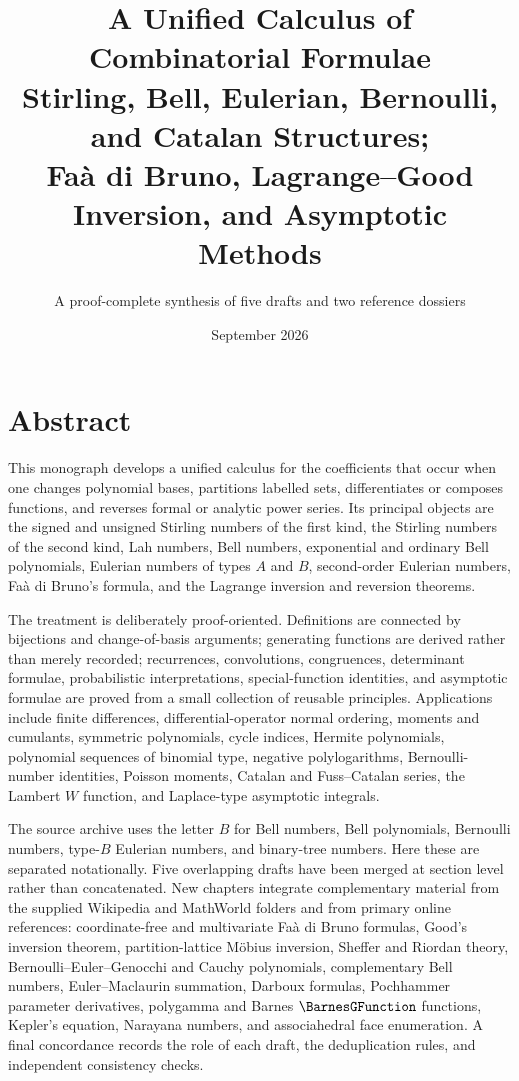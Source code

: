 \documentclass[11pt,a4paper,oneside,openany]{book}
\title{\Huge\bfseries A Unified Calculus of Combinatorial Formulae\\[4mm]
\Large Stirling, Bell, Eulerian, Bernoulli, and Catalan Structures;\\
Fa\`a di Bruno, Lagrange--Good Inversion, and Asymptotic Methods}
\author{A proof-complete synthesis of five drafts and two reference dossiers}
\date{September 2026}
\theoremstyle{definition}
\theoremstyle{remark}
\begin{document}
\frontmatter
\hypersetup{pageanchor=false}
\maketitle
\hypersetup{pageanchor=true}

\chapter*{Abstract}
This monograph develops a unified calculus for the coefficients that occur when one
changes polynomial bases, partitions labelled sets, differentiates or composes
functions, and reverses formal or analytic power series.  Its principal objects are
the signed and unsigned Stirling numbers of the first kind, the Stirling numbers of
the second kind, Lah numbers, Bell numbers, exponential and ordinary Bell
polynomials, Eulerian numbers of types $A$ and $B$, second-order Eulerian numbers,
Fa\`a di Bruno's formula, and the Lagrange inversion and reversion theorems.

The treatment is deliberately proof-oriented.  Definitions are connected by
bijections and change-of-basis arguments; generating functions are derived rather
than merely recorded; recurrences, convolutions, congruences, determinant formulae,
probabilistic interpretations, special-function identities, and asymptotic formulae
are proved from a small collection of reusable principles.  Applications include
finite differences, differential-operator normal ordering, moments and cumulants,
symmetric polynomials, cycle indices, Hermite polynomials, polynomial sequences of
binomial type, negative polylogarithms, Bernoulli-number identities, Poisson moments,
Catalan and Fuss--Catalan series, the Lambert $W$ function, and Laplace-type
asymptotic integrals.

The source archive uses the letter $B$ for Bell numbers, Bell polynomials, Bernoulli
numbers, type-$B$ Eulerian numbers, and binary-tree numbers. Here these are separated
notationally. Five overlapping drafts have been merged at section level rather than
concatenated. New chapters integrate complementary material from the supplied
Wikipedia and MathWorld folders and from primary online references: coordinate-free
and multivariate Fa\`a di Bruno formulas, Good's inversion theorem, partition-lattice
M\"obius inversion, Sheffer and Riordan theory, Bernoulli--Euler--Genocchi and Cauchy
polynomials, complementary Bell numbers, Euler--Maclaurin summation, Darboux formulas,
Pochhammer parameter derivatives, polygamma and Barnes $\BarnesGFunction$ functions, Kepler's
equation, Narayana numbers, and associahedral face enumeration. A final concordance
records the role of each draft, the deduplication rules, and independent consistency
checks.
\end{document}
